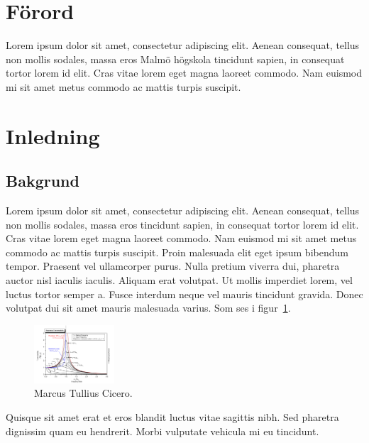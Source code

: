 \documentclass[11pt,a4paper]{article}
\begin{document}


\tableofcontents

\newpage
\section*{Förord}
%

Lorem ipsum dolor sit amet, consectetur adipiscing elit. Aenean
consequat, tellus non mollis sodales, massa eros Malmö högskola
tincidunt sapien, in consequat tortor lorem id elit. Cras vitae lorem
eget magna laoreet commodo. Nam euismod mi sit amet metus commodo ac
mattis turpis suscipit.

\newpage
\section{Inledning}
\subsection{Bakgrund}
Lorem ipsum dolor sit amet, consectetur adipiscing elit. Aenean
consequat, tellus non mollis sodales, massa eros tincidunt sapien, in
consequat tortor lorem id elit. Cras vitae lorem eget magna laoreet
commodo. Nam euismod mi sit amet metus commodo ac mattis turpis
suscipit. Proin malesuada elit eget ipsum bibendum tempor. Praesent
vel ullamcorper purus. Nulla pretium viverra dui, pharetra auctor nisl
iaculis iaculis. Aliquam erat volutpat. Ut mollis imperdiet lorem, vel
luctus tortor semper a. Fusce interdum neque vel mauris tincidunt
gravida. Donec volutpat dui sit amet mauris malesuada varius. Som ses
i figur~\ref{fig1}.


\begin{figure}[hbt]
  \begin{center}
    \includegraphics[width=3cm,angle=0]{fig1.png}
    \caption{Marcus Tullius Cicero.}
    \label{fig1}
  \end{center}
\end{figure}

Quisque sit amet erat et eros blandit luctus vitae sagittis nibh. Sed
pharetra dignissim quam eu hendrerit. Morbi vulputate vehicula mi eu
tincidunt.
\end{document}
